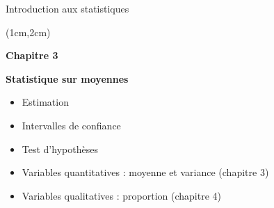 \documentclass{beamer}
\begin{document}

\begin{frame}{Introduction aux statistiques}
\begin{textblock*}{\textwidth}(1cm,2cm)

\begin{center}{\bf \Large Chapitre 3} \end{center}
\begin{center}{\bf \Large Statistique sur moyennes} \end{center}
\vspace{0.5cm}
\begin{itemize}
\item Estimation  
\item Intervalles de confiance
\item Test d'hypothèses 
\end{itemize}
\vspace{0.5cm}
\begin{itemize}
\item Variables quantitatives : moyenne et variance (chapitre 3)
\item Variables qualitatives : proportion (chapitre 4)
\end{itemize}

 \end{textblock*}

\end{frame}


\end{document}

